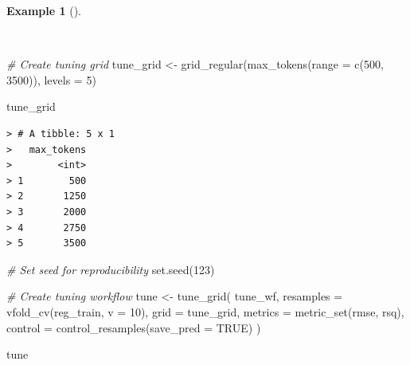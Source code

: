 \documentclass[
  letterpaper,
  DIV=11,
  numbers=noendperiod]{scrreprt}
\newenvironment{Shaded}{\begin{snugshade}}{\end{snugshade}}
\newcommand{\AttributeTok}[1]{\textcolor[rgb]{0.00,0.00,0.00}{#1}}
\newcommand{\CommentTok}[1]{\textcolor[rgb]{0.00,0.00,0.00}{\textit{#1}}}
\newcommand{\ConstantTok}[1]{\textcolor[rgb]{0.00,0.00,0.00}{#1}}
\newcommand{\DecValTok}[1]{\textcolor[rgb]{0.00,0.00,0.00}{#1}}
\newcommand{\FunctionTok}[1]{\textcolor[rgb]{0.00,0.00,0.00}{#1}}
\newcommand{\NormalTok}[1]{\textcolor[rgb]{0.00,0.00,0.00}{#1}}
\newcommand{\OtherTok}[1]{\textcolor[rgb]{0.00,0.00,0.00}{#1}}
\theoremstyle{definition}
\newtheorem{example}{Example}[chapter]
\theoremstyle{remark}
\begin{document}
\begin{example}[]\protect\hypertarget{exm-pda-reg-model-spec-random-forest-workflow-tune-grid}{}\label{exm-pda-reg-model-spec-random-forest-workflow-tune-grid}

~

\begin{Shaded}
\begin{Highlighting}[]
\CommentTok{\# Create tuning grid}
\NormalTok{tune\_grid }\OtherTok{\textless{}{-}}
  \FunctionTok{grid\_regular}\NormalTok{(}\FunctionTok{max\_tokens}\NormalTok{(}\AttributeTok{range =} \FunctionTok{c}\NormalTok{(}\DecValTok{500}\NormalTok{, }\DecValTok{3500}\NormalTok{)), }\AttributeTok{levels =} \DecValTok{5}\NormalTok{)}

\NormalTok{tune\_grid}
\end{Highlighting}
\end{Shaded}

\begin{verbatim}
> # A tibble: 5 x 1
>   max_tokens
>        <int>
> 1        500
> 2       1250
> 3       2000
> 4       2750
> 5       3500
\end{verbatim}

\begin{Shaded}
\begin{Highlighting}[]
\CommentTok{\# Set seed for reproducibility}
\FunctionTok{set.seed}\NormalTok{(}\DecValTok{123}\NormalTok{)}

\CommentTok{\# Create tuning workflow}
\NormalTok{tune }\OtherTok{\textless{}{-}}
  \FunctionTok{tune\_grid}\NormalTok{(}
\NormalTok{    tune\_wf,}
    \AttributeTok{resamples =} \FunctionTok{vfold\_cv}\NormalTok{(reg\_train, }\AttributeTok{v =} \DecValTok{10}\NormalTok{),}
    \AttributeTok{grid =}\NormalTok{ tune\_grid,}
    \AttributeTok{metrics =} \FunctionTok{metric\_set}\NormalTok{(rmse, rsq),}
    \AttributeTok{control =} \FunctionTok{control\_resamples}\NormalTok{(}\AttributeTok{save\_pred =} \ConstantTok{TRUE}\NormalTok{)}
\NormalTok{  )}

\NormalTok{tune}
\end{Highlighting}
\end{Shaded}


\end{example}
\end{document}
